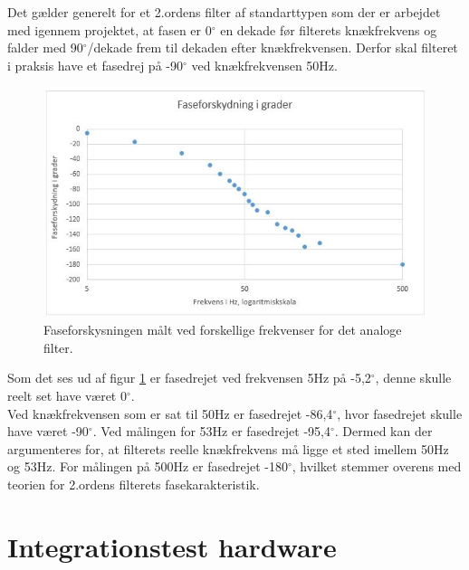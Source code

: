 Det gælder generelt for et 2.ordens filter af standarttypen som der er arbejdet med igennem projektet, at fasen er 0$^{\circ}$ en dekade før filterets knækfrekvens og falder med 90$^{\circ}$/dekade frem til dekaden efter knækfrekvensen. Derfor skal filteret i praksis have et fasedrej på -90$^{\circ}$ ved knækfrekvensen 50Hz.\\ 
\begin{figure}[H]
	\centering
	\includegraphics[width=1\textwidth]{Figurer/Hardware/FaseforskydningFilter}
	\caption{Faseforskysningen målt ved forskellige frekvenser for det analoge filter.}
	\label{fig:FilterFaseforskydning}
\end{figure}

Som det ses ud af figur \ref{fig:FilterFaseforskydning} er fasedrejet ved frekvensen 5Hz på -5,2$^{\circ}$, denne skulle reelt set have været 0$^{\circ}$. \\
Ved knækfrekvensen som er sat til 50Hz er fasedrejet -86,4$^{\circ}$, hvor fasedrejet skulle have været -90$^{\circ}$. Ved målingen for 53Hz er fasedrejet -95,4$^{\circ}$. Dermed kan der argumenteres for, at filterets reelle knækfrekvens må ligge et sted imellem 50Hz og 53Hz. 
For målingen på 500Hz er fasedrejet -180$^{\circ}$, hvilket stemmer overens med teorien for 2.ordens filterets fasekarakteristik.

\section{Integrationstest hardware}

